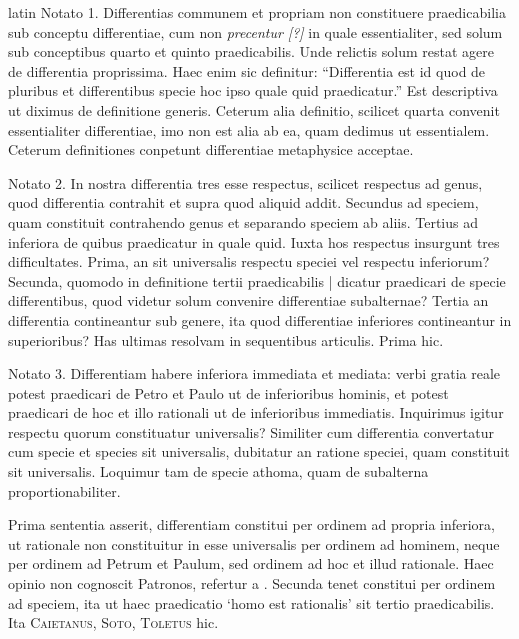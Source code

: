 \begin{otherlanguage*}{latin}
\pstart
 Notato 1. Differentias communem et propriam non constituere praedicabilia sub conceptu differentiae, cum non \emph{precentur [?]} in quale essentialiter, sed solum sub conceptibus quarto et quinto praedicabilis. Unde relictis solum restat agere de differentia proprissima. Haec enim sic definitur: \enquote{Differentia est id quod de pluribus et differentibus specie hoc ipso quale quid praedicatur.} Est descriptiva ut diximus de definitione generis. Ceterum alia definitio, scilicet quarta convenit essentialiter differentiae, imo non est alia ab ea, quam dedimus ut essentialem. Ceterum definitiones conpetunt differentiae metaphysice acceptae. 
\pend

\pstart
 Notato 2. In nostra differentia tres esse respectus, scilicet respectus ad genus, quod differentia contrahit et supra quod aliquid addit. Secundus ad speciem, quam constituit contrahendo genus et separando speciem ab aliis. Tertius ad inferiora de quibus praedicatur in quale quid. Iuxta hos respectus insurgunt tres difficultates. Prima, an sit universalis respectu speciei vel respectu inferiorum? Secunda, quomodo in definitione tertii praedicabilis \textnormal{|} dicatur praedicari de specie differentibus, quod videtur solum convenire differentiae subalternae? Tertia an differentia contineantur sub genere, ita quod differentiae inferiores contineantur in superioribus? Has ultimas resolvam in sequentibus articulis. Prima hic. 
\pend

\pstart
 Notato 3. Differentiam habere inferiora immediata et mediata: verbi gratia reale potest praedicari de Petro et Paulo ut de inferioribus hominis, et potest praedicari de hoc et illo rationali ut de inferioribus immediatis. Inquirimus igitur respectu quorum constituatur universalis? Similiter cum differentia convertatur cum specie et species sit universalis, dubitatur an ratione speciei, quam constituit sit universalis. Loquimur tam de specie athoma, quam de subalterna proportionabiliter. 
\pend

\pstart
 Prima sententia asserit, differentiam constitui per ordinem ad propria inferiora, ut rationale non constituitur in esse universalis per ordinem ad hominem, neque per ordinem ad Petrum et Paulum, sed ordinem ad hoc et illud rationale. Haec opinio non cognoscit Patronos, refertur a . Secunda tenet constitui per ordinem ad speciem, ita ut haec praedicatio `homo est rationalis' sit tertio praedicabilis. Ita \textsc{Caietanus}, \textsc{Soto}, \textsc{Toletus} hic. 
\pend


\end{otherlanguage*}
